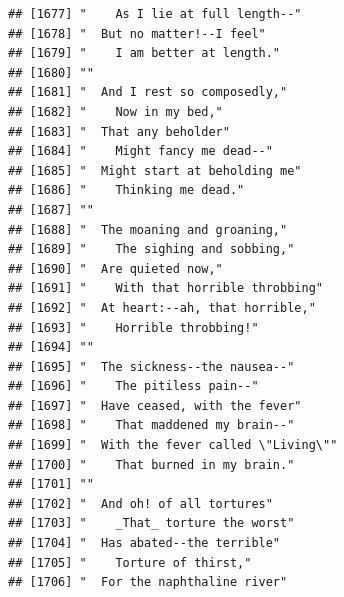 \documentclass{article}\usepackage[]{graphicx}\usepackage[]{color}
\makeatletter
\newenvironment{kframe}{%
 \def\at@end@of@kframe{}%
 \ifinner\ifhmode%
  \def\at@end@of@kframe{\end{minipage}}%
  \begin{minipage}{\columnwidth}%
 \fi\fi%
 \def\FrameCommand##1{\hskip\@totalleftmargin \hskip-\fboxsep
 \colorbox{shadecolor}{##1}\hskip-\fboxsep
     \hskip-\linewidth \hskip-\@totalleftmargin \hskip\columnwidth}%
 \MakeFramed {\advance\hsize-\width
   \@totalleftmargin\z@ \linewidth\hsize
   \@setminipage}}%
 {\par\unskip\endMakeFramed%
 \at@end@of@kframe}
\newenvironment{knitrout}{}{} %
\makeatother
\begin{document}
\begin{knitrout}
\begin{kframe}
\begin{verbatim}
## [1677] "    As I lie at full length--"                                               
## [1678] "  But no matter!--I feel"                                                    
## [1679] "    I am better at length."                                                  
## [1680] ""                                                                            
## [1681] "  And I rest so composedly,"                                                 
## [1682] "    Now in my bed,"                                                          
## [1683] "  That any beholder"                                                         
## [1684] "    Might fancy me dead--"                                                   
## [1685] "  Might start at beholding me"                                               
## [1686] "    Thinking me dead."                                                       
## [1687] ""                                                                            
## [1688] "  The moaning and groaning,"                                                 
## [1689] "    The sighing and sobbing,"                                                
## [1690] "  Are quieted now,"                                                          
## [1691] "    With that horrible throbbing"                                            
## [1692] "  At heart:--ah, that horrible,"                                             
## [1693] "    Horrible throbbing!"                                                     
## [1694] ""                                                                            
## [1695] "  The sickness--the nausea--"                                                
## [1696] "    The pitiless pain--"                                                     
## [1697] "  Have ceased, with the fever"                                               
## [1698] "    That maddened my brain--"                                                
## [1699] "  With the fever called \"Living\""                                          
## [1700] "    That burned in my brain."                                                
## [1701] ""                                                                            
## [1702] "  And oh! of all tortures"                                                   
## [1703] "    _That_ torture the worst"                                                
## [1704] "  Has abated--the terrible"                                                  
## [1705] "    Torture of thirst,"                                                      
## [1706] "  For the naphthaline river"                                                 

\end{verbatim}
\end{kframe}
\end{knitrout}
\end{document}

